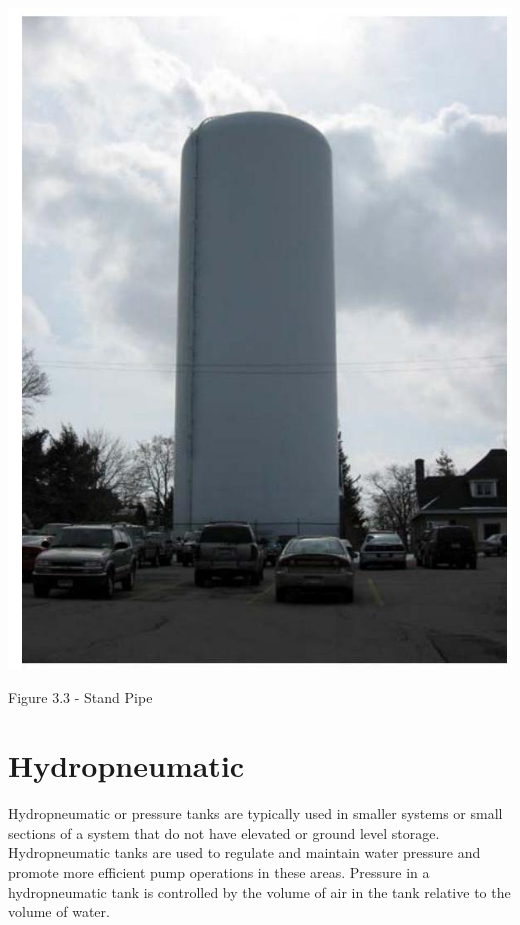 \documentclass[10pt]{article}
\begin{document}
\includegraphics[max width=\textwidth]{StandPipe1}

Figure $3.3$ - Stand Pipe

\section{Hydropneumatic}
Hydropneumatic or pressure tanks are typically used in smaller systems or small sections of a system that do not have elevated or ground level storage. Hydropneumatic tanks are used to regulate and maintain water pressure and promote more efficient pump operations in these areas. Pressure in a hydropneumatic tank is controlled by the volume of air in the tank relative to the volume of water.
\end{document}
